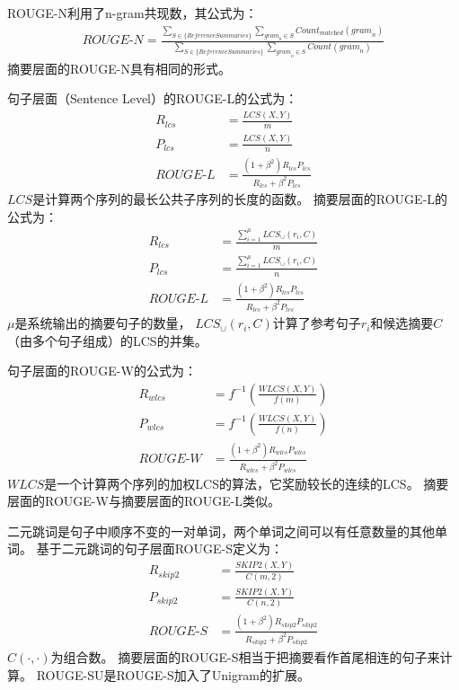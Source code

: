 ROUGE-N利用了n-gram共现数，其公式为：
\begin{align}
    \textit{ROUGE-N} = \frac{
    \sum_{S \in \{\textit{ReferenceSummaries}\}}
    \sum_{\textit{gram}_n \in S}
    \textit{Count}_\textit{matched}(\textit{gram}_n)
    }{
    \sum_{S \in \{\textit{ReferenceSummaries}\}}
    \sum_{\textit{gram}_n \in S}
    \textit{Count}(\textit{gram}_n)
    }
\end{align}
摘要层面的ROUGE-N具有相同的形式。

句子层面（Sentence Level）的ROUGE-L的公式为：
\begin{align}
    R_{lcs} &= \frac{\textit{LCS}(X, Y)}{m} \\
    P_{lcs} &= \frac{\textit{LCS}(X, Y)}{n} \\
    \textit{ROUGE-L} &= \frac{(1 + \beta^2) R_{lcs}P_{lcs}}
    {R_{lcs} + \beta^2 P_{lcs}}
\end{align}
$LCS$是计算两个序列的最长公共子序列的长度的函数。
摘要层面的ROUGE-L的公式为：
\begin{align}
    R_{lcs} &= \frac{\sum_{i=1}^\mu \textit{LCS}_\cup(r_i, C)}{m} \\
    P_{lcs} &= \frac{\sum_{i=1}^\mu \textit{LCS}_\cup(r_i, C)}{n} \\
    \textit{ROUGE-L} &= \frac{(1 + \beta^2) R_{lcs}P_{lcs}}{R_{lcs} + \beta^2 P_{lcs}}
\end{align}
$\mu$是系统输出的摘要句子的数量， $\textit{LCS}_\cup(r_i, C)$计算了参考句子$r_i$和候选摘要$C$（由多个句子组成）的LCS的并集。

句子层面的ROUGE-W的公式为：
\begin{align}
    R_{wlcs} &= f^{-1} \left( \frac{\textit{WLCS}(X, Y)}{f(m)} \right) \\
    P_{wlcs} &= f^{-1} \left( \frac{\textit{WLCS}(X, Y)}{f(n)} \right) \\
    \textit{ROUGE-W} &= \frac{(1 + \beta^2) R_{wlcs}P_{wlcs}}{R_{wlcs} + \beta^2 P_{wlcs}}
\end{align}
$\textit{WLCS}$是一个计算两个序列的加权LCS的算法，它奖励较长的连续的LCS。
摘要层面的ROUGE-W与摘要层面的ROUGE-L类似。

二元跳词是句子中顺序不变的一对单词，两个单词之间可以有任意数量的其他单词。
基于二元跳词的句子层面ROUGE-S定义为：
\begin{align}
    R_{skip2} &= \frac{\textit{SKIP2}(X, Y)}{C(m, 2)} \\
    P_{skip2} &= \frac{\textit{SKIP2}(X, Y)}{C(n, 2)} \\
    \textit{ROUGE-S} &= \frac{(1 + \beta^2) R_{skip2}P_{skip2}}{R_{skip2} + \beta^2 P_{skip2}}
\end{align}
$C(\cdot, \cdot)$为组合数。
摘要层面的ROUGE-S相当于把摘要看作首尾相连的句子来计算。
ROUGE-SU是ROUGE-S加入了Unigram的扩展。

